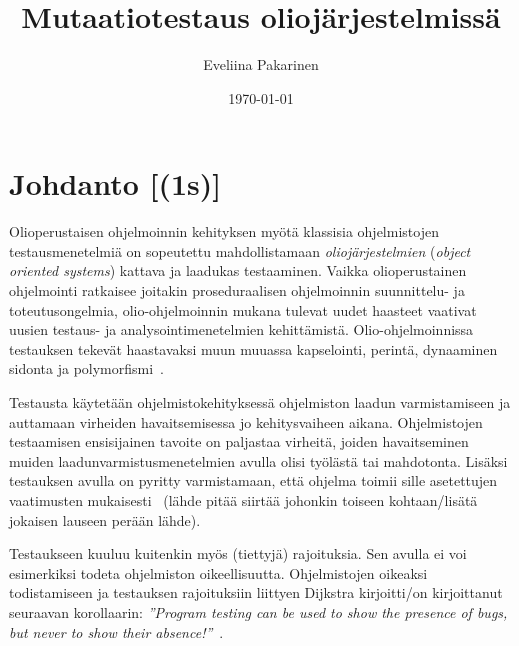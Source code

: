 \documentclass[finnish, grading]{tktltiki2}
\title{Mutaatiotestaus oliojärjestelmissä}
\author{Eveliina Pakarinen}
\date{\today}
\theoremstyle{definition}
\theoremstyle{remark}
\begin{document}

\frontmatter      %

\maketitle        %
\makeabstract     %

\tableofcontents  %


\mainmatter       %




\section{Johdanto [(1s)]}

Olioperustaisen ohjelmoinnin kehityksen myötä klassisia ohjelmistojen testausmenetelmiä on sopeutettu mahdollistamaan \textit{oliojärjestelmien} (\textit{object oriented systems}) kattava ja laadukas testaaminen. Vaikka olioperustainen ohjelmointi ratkaisee joitakin proseduraalisen ohjelmoinnin suunnittelu- ja toteutusongelmia, olio-ohjelmoinnin mukana tulevat uudet haasteet vaativat uusien testaus- ja analysointimenetelmien kehittämistä. Olio-ohjelmoinnissa testauksen tekevät haastavaksi muun muuassa kapselointi, perintä, dynaaminen sidonta ja polymorfismi~\cite[s. 86]{Mariani:Pezze:2008}.

Testausta käytetään ohjelmistokehityksessä ohjelmiston laadun varmistamiseen ja auttamaan virheiden havaitsemisessa jo kehitysvaiheen aikana. Ohjelmistojen testaamisen ensisijainen tavoite on paljastaa virheitä, joiden havaitseminen muiden laadunvarmistusmenetelmien avulla olisi työlästä tai mahdotonta. Lisäksi testauksen avulla on pyritty varmistamaan, että ohjelma toimii sille asetettujen vaatimusten mukaisesti~\cite[s. 59]{Binder:1999} (lähde pitää siirtää johonkin toiseen kohtaan/lisätä jokaisen lauseen perään lähde). 

Testaukseen kuuluu kuitenkin myös (tiettyjä) rajoituksia. Sen avulla ei voi esimerkiksi todeta ohjelmiston oikeellisuutta. Ohjelmistojen oikeaksi todistamiseen ja testauksen rajoituksiin liittyen Dijkstra kirjoitti/on kirjoittanut seuraavan korollaarin: \textit{''Program testing can be used to show the presence of bugs, but never to show their absence!''}~\cite[s. 6]{Dahl:Dijkstra:Hoare:1972}. 
\end{document}
